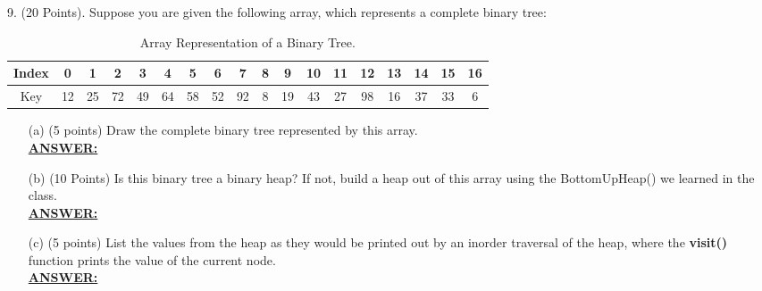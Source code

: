 \documentclass{article}
\newcommand{\answer}{\textbf{\\\underline{ANSWER:}\\}}
\begin{document}
\section*{}
9. (20 Points). Suppose you are given the following array, which
represents a complete binary tree:
\begin{table}[h]
  \begin{center}
    \begin{tabular}{|c|c|c|c|c|c|c|c|c|c|c|c|c|c|c|c|c|c|} 
      \hline Index &0&1&2&3&4&5&6&7&8&9&10&11&12&13&14&15&16 \\
      \hline Key&12&25&72&49&64&58&52&92&8&19&43&27&98&16&37&33&6\\
      \hline
    \end{tabular}
    \caption{Array Representation of a Binary Tree.} 
  \end{center}
\end{table}
\begin{enumerate}
\item[(a)] (5 points) Draw the complete binary tree represented by this
array. 
\answer 
\item[(b)] (10 Points) Is this binary tree a binary heap? If not, build a heap
out of this array using the BottomUpHeap() we learned in the class. 
\answer
\item[(c)] (5 points) List the values from the heap as they would be printed
out by an inorder traversal of the heap, where the \textbf{visit()} function
prints the value of the current node. 
\answer
\end{enumerate}

\end{document}
